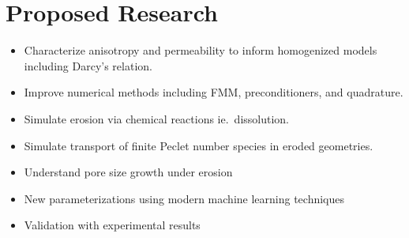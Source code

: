 \documentclass[11pt]{article}
\begin{document}
\section{Proposed Research} 
\begin{itemize}[noitemsep]
  \item Characterize anisotropy and permeability to inform homogenized
    models including Darcy's relation.

  \item Improve numerical methods including FMM, preconditioners, and
    quadrature.

  \item Simulate erosion via chemical reactions ie.~dissolution.

  \item Simulate transport of finite Peclet number species in eroded
    geometries.

  \item Understand pore size growth under erosion

  \item New parameterizations using modern machine learning techniques

  \item Validation with experimental results
\end{itemize}



\end{document}

